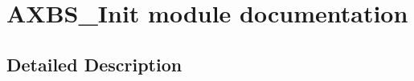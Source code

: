 \hypertarget{group___a_x_b_s___init__module}{}\section{A\+X\+B\+S\+\_\+\+Init module documentation}
\label{group___a_x_b_s___init__module}


\subsection{Detailed Description}
